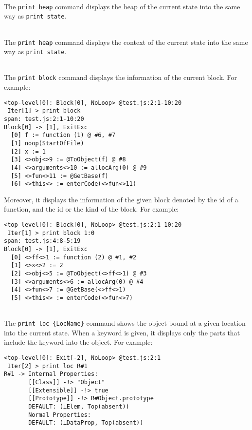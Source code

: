 \medskip\noindent
{}\\[.2em]
The \verb!print heap! command displays the heap of the current state
into the same way as \verb!print state!.

\medskip\noindent
{}\\[.2em]
The \verb!print heap! command displays the context of the current state
into the same way as \verb!print state!.

\medskip\noindent
{}\\[.2em]
The \verb!print block! command displays the information of
the current block. For example:
{\small
\begin{verbatim}
<top-level[0]: Block[0], NoLoop> @test.js:2:1-10:20
 Iter[1] > print block
span: test.js:2:1-10:20
Block[0] -> [1], ExitExc
  [0] f := function (1) @ #6, #7
  [1] noop(StartOfFile)
  [2] x := 1
  [3] <>obj<>9 := @ToObject(f) @ #8
  [4] <>arguments<>10 := allocArg(0) @ #9
  [5] <>fun<>11 := @GetBase(f)
  [6] <>this<> := enterCode(<>fun<>11)
\end{verbatim}
}

Moreover, it displays the information of the given block denoted
by the id of a function, and the id or the kind of the block.
For example:

{\small
\begin{verbatim}
<top-level[0]: Block[0], NoLoop> @test.js:2:1-10:20
 Iter[1] > print block 1:0
span: test.js:4:8-5:19
Block[0] -> [1], ExitExc
  [0] <>ff<>1 := function (2) @ #1, #2
  [1] <>x<>2 := 2
  [2] <>obj<>5 := @ToObject(<>ff<>1) @ #3
  [3] <>arguments<>6 := allocArg(0) @ #4
  [4] <>fun<>7 := @GetBase(<>ff<>1)
  [5] <>this<> := enterCode(<>fun<>7)
\end{verbatim}
}

\medskip\noindent
{}\\[.2em]
The \verb!print loc {LocName}! command shows the object
bound at a given location into the current state.
When a keyword is given, it displays only the parts that include the keyword
into the object.  For example:
{\small
\begin{verbatim}
<top-level[0]: Exit[-2], NoLoop> @test.js:2:1
 Iter[2] > print loc R#1
R#1 -> Internal Properties:
       [[Class]] -!> "Object"
       [[Extensible]] -!> true
       [[Prototype]] -!> R#Object.prototype
       DEFAULT: (⊥Elem, Top(absent))
       Normal Properties:
       DEFAULT: (⊥DataProp, Top(absent))
\end{verbatim}
}

